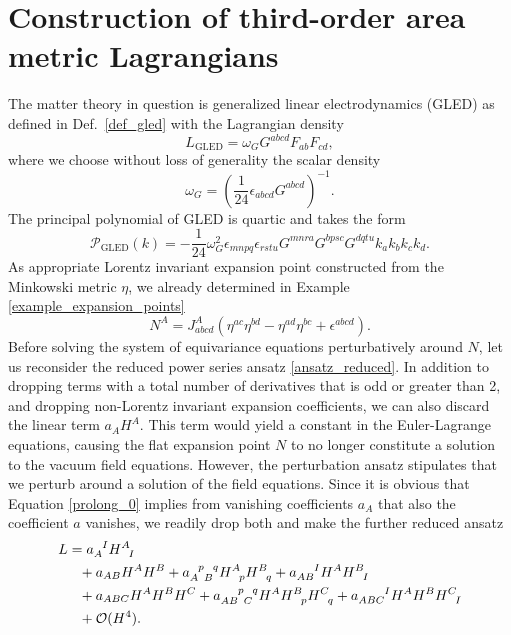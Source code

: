 \section{Construction of third-order area metric Lagrangians}\label{section_area_construction}
The matter theory in question is generalized linear electrodynamics (GLED) as defined in Def.~\ref{def_gled} with the Lagrangian density
\begin{equation}\label{lagrangian_gled}
  L_\text{GLED} = \omega_G G^{abcd} F_{ab} F_{cd},
\end{equation}
where we choose without loss of generality the scalar density
\begin{equation}\label{area_density}
  \omega_G = \left(\frac{1}{24}\epsilon_{abcd}G^{abcd}\right)^{-1}.
\end{equation}
The principal polynomial of GLED is quartic and takes the form
\begin{equation}
  \mathcal P_\text{GLED}(k) = -\frac{1}{24} \omega_G^2 \epsilon_{mnpq} \epsilon_{rstu} G^{mnra} G^{bpsc} G^{dqtu} k_a k_b k_c k_d.
\end{equation}
As appropriate Lorentz invariant expansion point constructed from the Minkowski metric $\eta$, we already determined in Example \ref{example_expansion_points}
\begin{equation}\label{area_expansion_point}
  N^A = J_{abcd}^A (\eta^{ac} \eta^{bd} - \eta^{ad} \eta^{bc} + \epsilon^{abcd}).
\end{equation}
Before solving the system of equivariance equations perturbatively around $N$, let us reconsider the reduced power series ansatz \eqref{ansatz_reduced}. In addition to dropping terms with a total number of derivatives that is odd or greater than 2, and dropping non-Lorentz invariant expansion coefficients, we can also discard the linear term $a_A H^A$. This term would yield a constant in the Euler-Lagrange equations, causing the flat expansion point $N$ to no longer constitute a solution to the vacuum field equations. However, the perturbation ansatz stipulates that we perturb around a solution of the field equations. Since it is obvious that Equation \eqref{prolong_0} implies from vanishing coefficients $a_A$ that also the coefficient $a$ vanishes, we readily drop both and make the further reduced ansatz
\begin{equation}\label{ansatz_area_gravity}
  \begin{aligned}
    L &{} = a_A^{\hphantom AI} H^A_{\hphantom AI} \\
      &{} \hphantom{=} + a_{AB} H^A H^B + a_{A\hphantom pB}^{\hphantom Ap\hphantom Bq} H^A_{\hphantom Ap} H^B_{\hphantom Bq} + a_{AB}^{\hphantom{AB}I} H^A H^B_{\hphantom BI} \\
      &{} \hphantom{=} + a_{ABC} H^A H^B H^C + a_{AB\hphantom pC}^{\hphantom{AB}p\hphantom Cq} H^A H^B_{\hphantom Bp} H^C_{\hphantom Cq} + a_{ABC}^{\hphantom{ABC}I} H^A H^B H^C_{\hphantom CI} \\
      &{} \hphantom{=} + \mathcal O(H^4).
  \end{aligned}
\end{equation}

